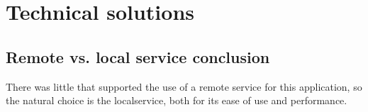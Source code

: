 \section{Technical solutions}

\subsection{Remote vs. local service conclusion}
There was little that supported the use of a remote service for this application, so the natural choice is the localservice, both for its ease of use and performance. 
